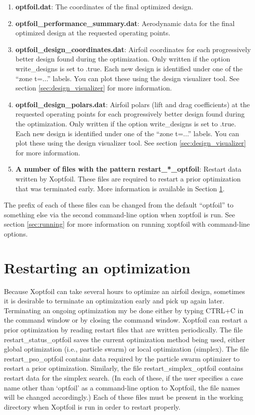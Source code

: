 \documentclass[11pt]{article}
\begin{document}
\begin{enumerate}
\item{\textbf{optfoil.dat}: The coordinates of the final optimized design.}
\item{\textbf{optfoil\_performance\_summary.dat}: Aerodynamic data for the final optimized
design at the requested operating points.}
\item{\textbf{optfoil\_design\_coordinates.dat}: Airfoil coordinates for each
progressively better design found during the optimization.  Only written if the option
write\_designs is set to .true.  Each new design is identified under one of the ``zone
t=...'' labels.  You can plot these using the design visualizer tool. See section 
\ref{sec:design_visualizer} for more information.}
\item{\textbf{optfoil\_design\_polars.dat}: Airfoil polars (lift and drag coefficients) at
the requested operating points for each progressively better design found during the 
optimization.  Only written if the option write\_designs is set to .true.  Each new design
is identified under one of the ``zone t=...'' labels.  You can plot these using the design
visualizer tool. See section \ref{sec:design_visualizer} for more information.}
\item{\textbf{A number of files with the pattern restart\_*\_optfoil}: Restart data
written by Xoptfoil.  These files are required to restart a prior optimization that was
terminated early. More information is available in Section \ref{sec:restarting}.}
\end{enumerate}

The prefix of each of these files can be changed from the default ``optfoil'' to something
else via the second command-line option when xoptfoil is run. See section
\ref{sec:running} for more information on running xoptfoil with command-line options.

\section{Restarting an optimization}\label{sec:restarting}

Because Xoptfoil can take several hours to optimize an airfoil design, sometimes it is
desirable to terminate an optimization early and pick up again later.  Terminating an
ongoing optimization my be done either by typing CTRL+C in the command window or by
closing the command window.  Xoptfoil can restart a prior optimization
by reading restart files that are written periodically. The file restart\_status\_optfoil
saves the current optimization method being used, either global optimization (i.e.,
particle swarm) or local optimization (simplex).  The file restart\_pso\_optfoil contains
data required by the particle swarm optimizer to restart a prior optimization. Similarly,
the file restart\_simplex\_optfoil contains restart data for the simplex search. (In each
of these, if the user specifies a case name other than `optfoil' as a command-line option
to Xoptfoil, the file names will be changed accordingly.)  Each of these files must be
present in the working directory when Xoptfoil is run in order to restart properly.
\end{document}
